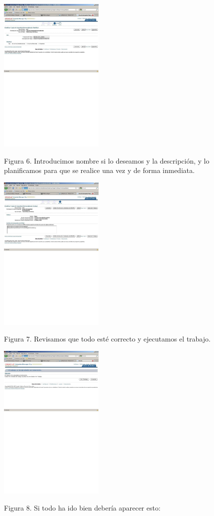 \documentclass[12pt,letterpaper]{article}
\begin{document}
{\begin{figure}[H]
	\centering
	\caption{Figura 6. Introducimos nombre si lo deseamos y la descripción, y lo planificamos para que se realice una vez y de forma inmediata.}
	\includegraphics[height=3in]{./IMG/acevedo1.png}
	\label{fig:fig1}
\end{figure}

\begin{figure}[H]
	\centering
	\caption{Figura 7. Revisamos que todo esté correcto y ejecutamos el trabajo.}
	\includegraphics[height=3in]{./IMG/acevedo2.png}
	\label{fig:fig1}
\end{figure}

\begin{figure}[H]
	\centering
	\caption{Figura 8. Si todo ha ido bien debería aparecer esto:}
	\includegraphics[height=3in]{./IMG/acevedo3.png}
	\label{fig:fig1}
\end{figure}

}
\end{document}
